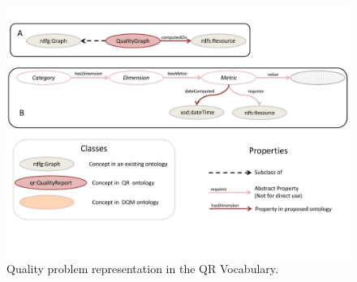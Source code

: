 \begin{figure}[ht!]
\centering
\includegraphics[page=4,trim=0.2cm 9.5cm 0.2cm 6.5cm,clip,width=\textwidth]{figures/cleaning.pdf}\caption{Quality problem representation  in the QR Vocabulary.}
\label{fig:ontology3}
\end{figure}
\label{sub:generation}




